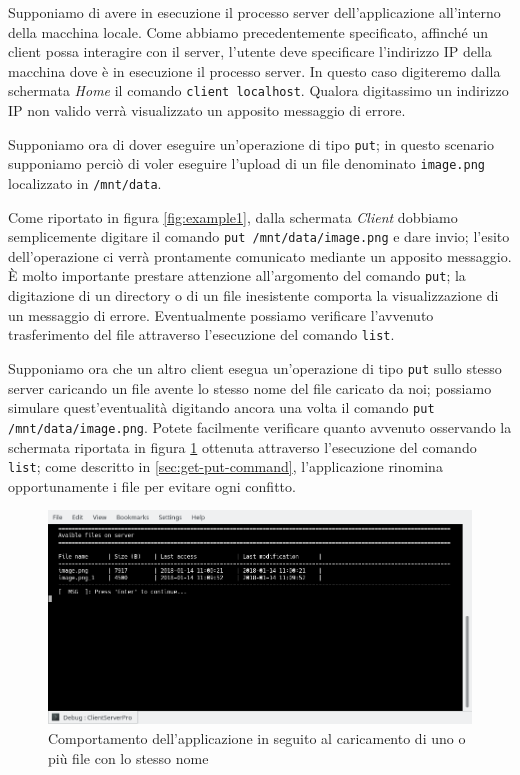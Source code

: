 \documentclass[10pt,a4paper, titlepage]{report}
\begin{document}
Supponiamo di avere in esecuzione il processo server dell'applicazione all'interno della macchina locale. Come abbiamo precedentemente specificato, affinché un client possa interagire con il server, l'utente deve specificare l'indirizzo IP della macchina dove è in esecuzione il processo server. In questo caso digiteremo dalla schermata \textit{Home} il comando \texttt{client localhost}. Qualora digitassimo un indirizzo IP non valido verrà visualizzato un apposito messaggio di errore.

Supponiamo ora di dover eseguire un'operazione di tipo \texttt{put}; in questo scenario supponiamo perciò di voler eseguire l'upload di un file denominato \texttt{image.png} localizzato in \texttt{/mnt/data}.

Come riportato in figura \ref{fig:example1}, dalla schermata \textit{Client} dobbiamo semplicemente digitare il comando \texttt{put /mnt/data/image.png} e dare invio; l'esito dell'operazione ci verrà prontamente comunicato mediante un apposito messaggio.
È molto importante prestare attenzione all'argomento del comando \texttt{put}; la digitazione di un directory o di un file inesistente comporta la visualizzazione di un messaggio di errore. Eventualmente possiamo verificare l'avvenuto trasferimento del file attraverso l'esecuzione del comando \texttt{list}.

Supponiamo ora che un altro client esegua un'operazione di tipo \texttt{put} sullo stesso server caricando un file avente lo stesso nome del file caricato da noi; possiamo simulare quest'eventualità digitando ancora una volta il comando \texttt{put /mnt/data/image.png}. Potete facilmente verificare quanto avvenuto osservando la schermata riportata in figura \ref{fig:example2} ottenuta attraverso l'esecuzione del comando \texttt{list}; come descritto in \ref{sec:get-put-command}, l'applicazione rinomina opportunamente i file per evitare ogni confitto.

\begin{figure}
\centering
\includegraphics[width=\textwidth,  height=0.25\textheight]{Example2}
\caption{Comportamento dell'applicazione in seguito al caricamento di uno o più file con lo stesso nome}
\label{fig:example2}
\end{figure}
\end{document}
